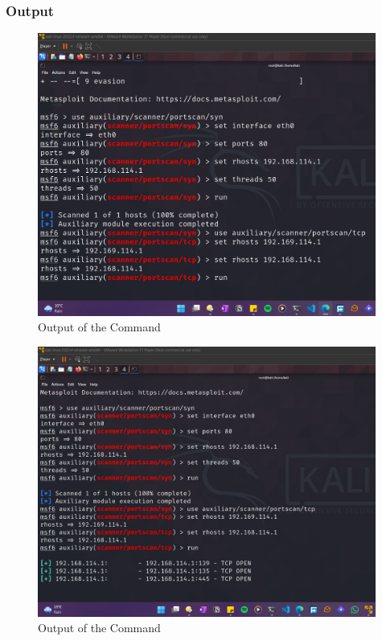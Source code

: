 \documentclass[11pt]{article}
\begin{document}
\subsubsection*{Output}
\begin{figure}[H]
    \centering
    \includegraphics[width=0.99\textwidth]{metasploit tcp (2).png}
    \caption{Output of the Command}
\end{figure}
\begin{figure}[H]
    \centering
    \includegraphics[width=0.99\textwidth]{metasploit tcp (3).png}
    \caption{Output of the Command}
\end{figure}
\end{document}
